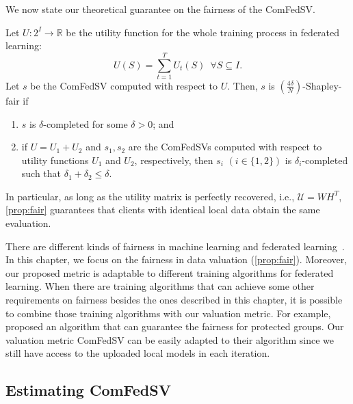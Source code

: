 We now state our theoretical guarantee on the fairness of the ComFedSV. 

\begin{theorem} \label{prop:fair}
    Let $U: 2^I \to \mathbb{R}$ be the utility function for the whole training process in federated learning: 
    \[U(S) = \sum_{t=1}^T U_t(S) \enspace \forall S \subseteq I.\]
    Let $s$ be the ComFedSV computed with respect to $U$.  Then, $s$ is $(\frac{4\delta}{N})$-Shapley-fair if
    \begin{enumerate}
        \item  $s$ is $\delta$-completed for some $\delta > 0$; and 
        \item if $U = U_1 + U_2$ and $s_1, s_2$ are the ComFedSVs computed with respect to utility functions $U_1$ and $U_2$, respectively, then $s_i$ $(i \in \{1,2\})$ is $\delta_i$-completed such that $\delta_1 + \delta_2 \leq \delta$. 
    \end{enumerate}
\end{theorem}

In particular, as long as the utility matrix is perfectly recovered, i.e., $\mathcal{U} = WH^T$, \autoref{prop:fair} guarantees that clients with identical local data obtain the same evaluation.

There are different kinds of fairness in machine learning and federated learning~\citep{zemel2013learning,donini2018empirical,li2019fair,lyu2020collaborative,chu2021fedfair}. In this chapter, we focus on the fairness in data valuation (\autoref{prop:fair}). Moreover, our proposed metric is adaptable to different training algorithms for federated learning. When there are training algorithms that can achieve some other requirements on fairness besides the ones described in this chapter, it is possible to combine those training algorithms with our valuation metric. For example, \citet{chu2021fedfair} proposed an algorithm that can guarantee the fairness for protected groups. Our valuation metric ComFedSV can be easily adapted to their algorithm since we still have access to the uploaded local models in each iteration.

\subsection{Estimating ComFedSV} \label{sec:7-6-5}

